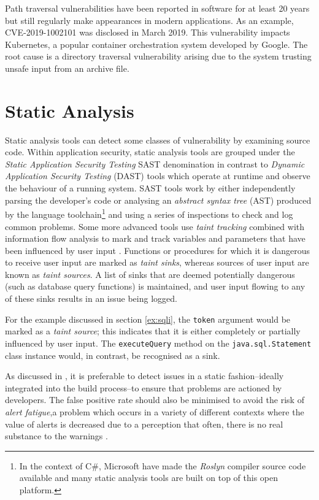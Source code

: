 \documentclass[a4paper,openany,12pt]{book}
\begin{document}
Path traversal vulnerabilities have been reported in software for at least 20 years but still regularly make appearances
in modern applications.
As an example, CVE-2019-1002101 was disclosed in March 2019.
This vulnerability impacts Kubernetes, a popular container orchestration system developed by Google.
The root cause is a directory traversal vulnerability arising due to the system trusting unsafe input from an archive
file.

\section{Static Analysis}

Static analysis tools can detect some classes of vulnerability by examining source code.
Within application security, static analysis tools are grouped under the \emph{Static Application Security Testing} SAST
denomination in contrast to \emph{Dynamic Application Security Testing} (DAST) tools which operate at runtime and
observe the behaviour of a running system.
SAST tools work by either independently parsing the developer's code or
analysing an \emph{abstract syntax tree} (AST) produced by the language toolchain\footnote{%
    In the context of C\#, Microsoft have made the \emph{Roslyn} compiler source code available and many static analysis
    tools are built on top of this open platform.}
and using a series of inspections to check and log common problems.
Some more advanced tools use \emph{taint tracking} combined with information flow analysis to mark and track variables
and parameters that have been influenced by user input \citep{denning1977certification}.
Functions or procedures for which it is dangerous to receive user input are marked as \emph{taint sinks}, whereas
sources of user input are known as \emph{taint sources}.
A list of sinks that are deemed potentially dangerous (such as database query functions) is maintained, and user input
flowing to any of these sinks results in an issue being logged.

For the example discussed in section \ref{ex:sqli}, the \texttt{token} argument would be marked as a
\emph{taint source}; this indicates that it is either completely or partially influenced by user input.
The \texttt{executeQuery} method on the \texttt{java.sql.Statement} class instance would, in contrast, be recognised
as a sink.

As discussed in \citet{sadowski2018lessons}, it is preferable to detect issues in a static fashion--ideally integrated
into the build process--to ensure that problems are actioned by developers.
The false positive rate should also be minimised to avoid the risk of \emph{alert fatigue},a problem which occurs in a
variety of different contexts where the value of alerts is decreased due to a perception that often, there is no real
substance to the warnings \citep{kesselheim2011clinical}.
\end{document}
